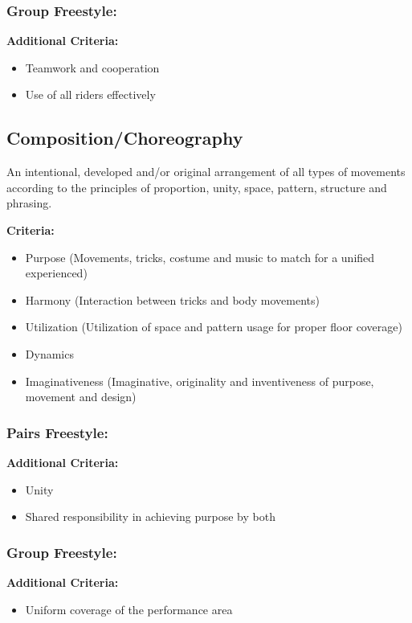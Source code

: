\subsubsection{Group Freestyle:}
\textbf{Additional Criteria:}
\begin{itemize}
\item Teamwork and cooperation
\item Use of all riders effectively
\end{itemize}

\subsection{Composition/Choreography}
An intentional, developed and/or original arrangement of all types of movements according to the principles of proportion, unity, space, pattern, structure and phrasing.

\textbf{Criteria:}
\begin{itemize}
\item Purpose (Movements, tricks, costume and music to match for a unified experienced)
\item Harmony (Interaction between tricks and body movements)
\item Utilization (Utilization of space and pattern usage for proper floor coverage)
\item Dynamics
\item Imaginativeness (Imaginative, originality and inventiveness of purpose, movement and design)
\end{itemize}

\subsubsection{Pairs Freestyle:}
\textbf{Additional Criteria:}
\begin{itemize}
\item Unity
\item Shared responsibility in achieving purpose by both
\end{itemize}

\subsubsection{Group Freestyle:}
\textbf{Additional Criteria:}
\begin{itemize}
\item Uniform coverage of the performance area
\end{itemize}

